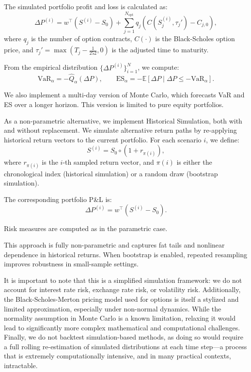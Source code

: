 \documentclass[12pt]{article}
\begin{document}
The simulated portfolio profit and loss is calculated as:
\[
\Delta P^{(i)} = w^\top(S^{(i)} - S_0) + \sum_{j=1}^{N_{\mathrm{opt}}} q_j \left(C(S_j^{(i)}, \tau_j') - C_{j,0}\right),
\]
where \( q_j \) is the number of option contracts, \( C(\cdot) \) is the Black-Scholes option price, and \( \tau_j' = \max(T_j - \tfrac{1}{252}, 0) \) is the adjusted time to maturity.

From the empirical distribution \( \{\Delta P^{(i)}\}_{i=1}^N \), we compute:
\[
\text{VaR}_\alpha = -\widehat{Q}_\alpha(\Delta P), \qquad
\text{ES}_\alpha = -\mathbb{E}[\Delta P \mid \Delta P \le -\text{VaR}_\alpha].
\]

We also implement a multi-day version of Monte Carlo, which forecasts VaR and ES over a longer horizon. This version is limited to pure equity portfolios.

As a non-parametric alternative, we implement Historical Simulation, both with and without replacement. We simulate alternative return paths by re-applying historical return vectors to the current portfolio. For each scenario \( i \), we define:
\[
S^{(i)} = S_0 \circ (1 + r_{\pi(i)}),
\]
where \( r_{\pi(i)} \) is the \( i \)-th sampled return vector, and \( \pi(i) \) is either the chronological index (historical simulation) or a random draw (bootstrap simulation).

The corresponding portfolio P\&L is:
\[
\Delta P^{(i)} = w^\top (S^{(i)} - S_0).
\]

Risk measures are computed as in the parametric case.

This approach is fully non-parametric and captures fat tails and nonlinear dependence in historical returns. When bootstrap is enabled, repeated resampling improves robustness in small-sample settings.

It is important to note that this is a simplified simulation framework: we do not account for interest rate risk, exchange rate risk, or volatility risk. Additionally, the Black-Scholes-Merton pricing model used for options is itself a stylized and limited approximation, especially under non-normal dynamics. While the normality assumption in Monte Carlo is a known limitation, relaxing it would lead to significantly more complex mathematical and computational challenges. Finally, we do not backtest simulation-based methods, as doing so would require a full rolling re-estimation of simulated distributions at each time step—a process that is extremely computationally intensive, and in many practical contexts, intractable.
\end{document}
